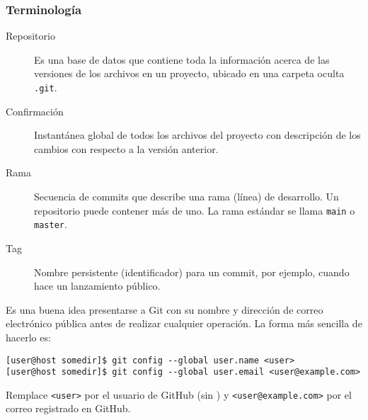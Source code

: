 \begin{frame}
	\frametitle{Terminología
		📖}
	\begin{description}
		\item[Repositorio]

			Es una base de datos que contiene toda la información
			acerca de las versiones de los archivos en un proyecto,
			ubicado en una carpeta oculta \lstinline|.git|.

		\item[Confirmación]

			Instantánea global de todos los archivos del proyecto
			con descripción de los cambios con respecto a la versión anterior.

		\item[Rama]

			Secuencia de commits que describe una rama (línea) de
			desarrollo.
			Un repositorio puede contener más de uno.
			La rama estándar se llama \lstinline|main| o \lstinline|master|.

		\item[Tag]

			Nombre persistente (identificador) para un commit, por
			ejemplo, cuando hace un lanzamiento público.
	\end{description}
\end{frame}

\begin{frame}[fragile]
	Es una buena idea presentarse a Git con su nombre y dirección de
	correo electrónico pública antes de realizar cualquier operación.
	La forma más sencilla de hacerlo es:

	\begin{verbatim}
[user@host somedir]$ git config --global user.name <user>
[user@host somedir]$ git config --global user.email <user@example.com>
	\end{verbatim}

	Remplace \lstinline|<user>| por el
	usuario de GitHub (sin \MVAt) y
	\lstinline|<user@example.com>| por el correo
	registrado en GitHub.
\end{frame}



